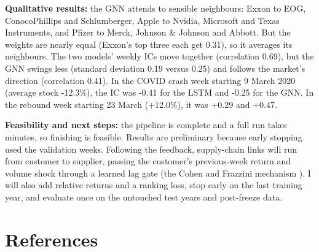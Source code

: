 \documentclass[final]{article}
\begin{document}
\textbf{Qualitative results:} the GNN attends to sensible neighbours: Exxon to EOG, ConocoPhillips and Schlumberger, Apple to Nvidia, Microsoft and Texas Instruments, and Pfizer to Merck, Johnson \& Johnson and Abbott. But the weights are nearly equal (Exxon's top three each get 0.31), so it averages its neighbours. The two models' weekly ICs move together (correlation 0.69), but the GNN swings less (standard deviation 0.19 versus 0.25) and follows the market's direction (correlation 0.41). In the COVID crash week starting 9 March 2020 (average stock -12.3\%), the IC was -0.41 for the LSTM and -0.25 for the GNN. In the rebound week starting 23 March (+12.0\%), it was +0.29 and +0.47.



\textbf{Feasibility and next steps:} the pipeline is complete and a full run takes minutes, so finishing is feasible. Results are preliminary because early stopping used the validation weeks. Following the feedback, supply-chain links will run from customer to supplier, passing the customer's previous-week return and volume shock through a learned lag gate (the Cohen and Frazzini mechanism \cite{cohen2008economic}). I will also add relative returns and a ranking loss, stop early on the last training year, and evaluate once on the untouched test years and post-freeze data.

\newpage
\section*{References}

\renewcommand{\refname}{\vspace{-0.6cm}}

\end{document}
